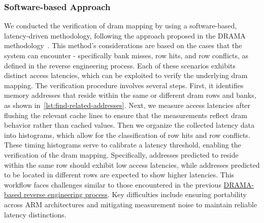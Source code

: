     \subsubsection{Software-based Approach} \label{subsubsec:software-based}
        We conducted the verification of \gls{dram} mapping by using a software-based, latency-driven methodology, 
        following the approach proposed in the DRAMA methodology~\cite{toolDrama}. This method's 
        considerations are based on the cases that the system can encounter - specifically bank misses, row hits, 
        and row conflicts, as defined in the reverse engineering process. Each of these scenarios 
        exhibits distinct access latencies, which can be exploited to verify the underlying \gls{dram} mapping.
        The verification procedure involves several steps. First, it identifies memory addresses that 
        reside within the same or different \gls{dram} rows and banks, as shown in~\cref{lst:find-related-addresses}.
        Next, we measure access latencies after flushing the relevant cache lines to ensure that the 
        measurements reflect \gls{dram} behavior rather than cached values. Then we organize the collected latency data  
        into histograms, which allow for the classification of row hits and row conflicts. These timing histograms 
        serve to calibrate a latency threshold, enabling the verification of the \gls{dram} mapping. Specifically, 
        addresses predicted to reside within the same row should exhibit low access latencies, while 
        addresses predicted to be located in different rows are expected to show higher latencies.
        This workflow faces challenges similar to those encountered in the previous 
        \hyperref[subsubsec:bank-function-derivation]{DRAMA-based reverse engineering process}. 
        Key difficulties include ensuring portability across ARM architectures and 
        mitigating measurement noise to maintain reliable latency distinctions.

        

